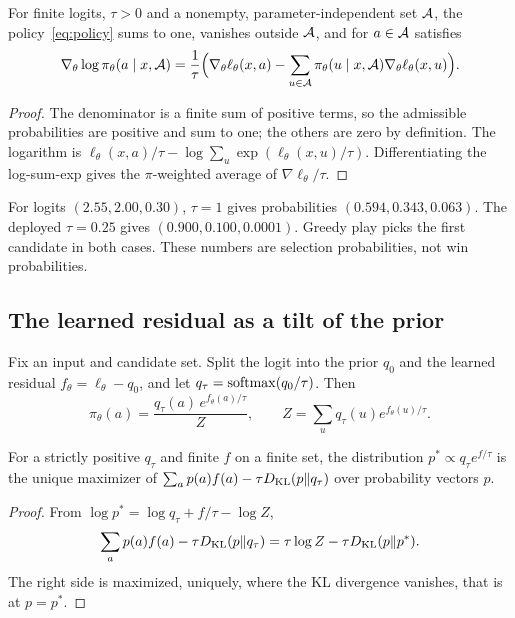 \begin{proposition}
\label{prop:mask}
For finite logits, $\tau>0$ and a nonempty, parameter-independent set $\mathcal{A}$,
the policy~\eqref{eq:policy} sums to one, vanishes outside $\mathcal{A}$, and for
$a\in\mathcal{A}$ satisfies
\begin{equation}
  \nabla_\theta\log\pi_\theta(a\mid x,\mathcal{A})
  =\frac1\tau\Big(\nabla_\theta\ell_\theta(x,a)
   -\sum_{u\in\mathcal{A}}\pi_\theta(u\mid x,\mathcal{A})\nabla_\theta\ell_\theta(x,u)\Big).
\end{equation}
\end{proposition}
\begin{proof}
The denominator is a finite sum of positive terms, so the admissible
probabilities are positive and sum to one; the others are zero by definition.
The logarithm is $\ell_\theta(x,a)/\tau-\log\sum_u\exp(\ell_\theta(x,u)/\tau)$.
Differentiating the log-sum-exp gives the $\pi$-weighted average of
$\nabla\ell_\theta/\tau$.
\end{proof}


\begin{example}
\label{ex:temperature}
For logits $(2.55,2.00,0.30)$, $\tau=1$ gives probabilities
$(0.594,0.343,0.063)$. The deployed $\tau=0.25$ gives
$(0.900,0.100,0.0001)$. Greedy play picks the first candidate in both cases.
These numbers are selection probabilities, not win probabilities.
\end{example}

\subsection{The learned residual as a tilt of the prior}
Fix an input and candidate set. Split the logit into the prior $q_0$ and the
learned residual $f_\theta=\ell_\theta-q_0$, and let
$q_\tau=\operatorname{softmax}(q_0/\tau)$. Then
\begin{equation}
  \pi_\theta(a)=\frac{q_\tau(a)\,e^{f_\theta(a)/\tau}}{Z},\qquad
  Z=\sum_uq_\tau(u)e^{f_\theta(u)/\tau}.
\end{equation}

\begin{proposition}
\label{prop:variational}
For a strictly positive $q_\tau$ and finite $f$ on a finite set, the
distribution $p^*\propto q_\tau e^{f/\tau}$ is the unique maximizer of
$\sum_ap(a)f(a)-\tau D_{\mathrm{KL}}(p\Vert q_\tau)$ over probability vectors $p$.
\end{proposition}
\begin{proof}
From $\log p^*=\log q_\tau+f/\tau-\log Z$,
\[
  \sum_ap(a)f(a)-\tau D_{\mathrm{KL}}(p\Vert q_\tau)=\tau\log Z-\tau D_{\mathrm{KL}}(p\Vert p^*).
\]
The right side is maximized, uniquely, where the KL divergence vanishes,
that is at $p=p^*$.
\end{proof}

